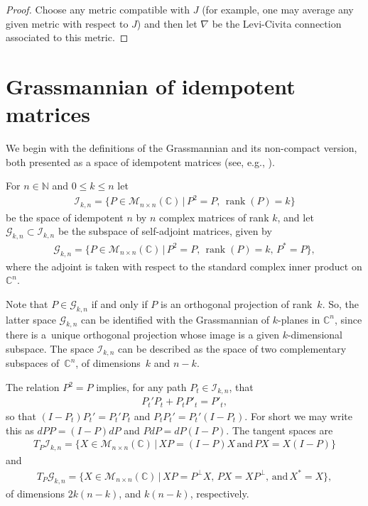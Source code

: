 \documentclass[11pt]{article}
\numberwithin{equation}{section}
\newcommand{\N}{\mathbb{N}}
\newcommand{\CC}{\mathbb{C}}
\newcommand{\cG}{{\mathcal G}}
\newcommand{\cI}{{\mathcal I}}
\begin{document}
\begin{proof}Choose any metric compatible with $J$ (for example, one may average any given metric with respect to $J$) and then let $\nabla$ be the Levi-Civita connection associated to this metric.
\end{proof}

\section{Grassmannian of idempotent matrices} \label{sec;grass}

We begin with the definitions of the Grassmannian and its non-compact version, both presented as a space of idempotent matrices (see, e.g., \cite[Problem~5-C]{MS}).

\begin{defn}For $n \in \N$ and $0 \leq k \leq n$ let
\begin{gather*}
\cI_{k,n} = \big\{ P \in \mathcal{M}_{n \times n}(\CC) \,| \, P^2 = P, \, \operatorname{rank}(P) = k \big\}
\end{gather*}
be the space of idempotent $n$ by $n$ complex matrices of rank $k$, and let $ \cG_{k,n} \subset \cI_{k,n}$ be the subspace of self-adjoint matrices, given by
\begin{gather*}
\cG_{k,n} = \big\{ P \in \mathcal{M}_{n \times n}(\CC)\, | \, P^2 = P ,\, \operatorname{rank}(P) = k, \, P^* = P \big\},
\end{gather*}
where the adjoint is taken with respect to the standard complex inner product on $\CC^n$.
\end{defn}

Note that $P \in \cG_{k,n}$ if and only if $P$ is an orthogonal projection of rank~$k$. So, the latter space $\cG_{k,n}$ can be identified with the Grassmannian of $k$-planes in $\CC^n$, since there is a~unique orthogonal projection whose image is a given $k$-dimensional subspace. The space $\cI_{k,n}$ can be described as the space of two complementary subspaces of~$\CC^n$, of dimensions~$k$ and $n-k$.

The relation $P^2 = P$ implies, for any path $P_t \in \cI_{k,n}$, that
\begin{gather*}
P_t' P_t + P_t P'_t = P'_t,
\end{gather*}
so that $(I-P_t)P_t' = P_t'P_t$ and $P_t P_t' = P_t' (I-P_t)$. For short we may write this as $dPP= (I-P)dP$ and $P dP= dP (I-P)$. The tangent spaces are
\begin{gather*}
T_P\cI_{k,n} = \big\{ X \in \mathcal{M}_{n \times n}(\CC)\, |\, XP= (I-P)X \, \textrm{and} \, PX= X(I-P) \big\}
\end{gather*}
and
\begin{gather*}
T_P \cG_{k,n} = \big\{ X \in \mathcal{M}_{n \times n}(\CC) \,| \, XP = P^\perp X, \, PX= X P^\perp , \, \textrm{and} \, X^*=X \big\},
\end{gather*}
of dimensions $2k(n-k)$, and $k(n-k)$, respectively.
\end{document}
